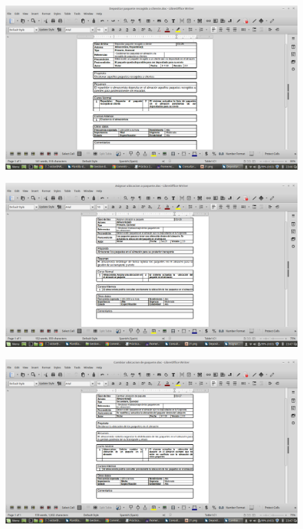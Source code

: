 \begin{figure}[H]
	\centering
	\includegraphics[width=16cm]{25}
\end{figure}
\begin{figure}[H]
	\centering
	\includegraphics[width=16cm]{26}
\end{figure}
\begin{figure}[H]
	\centering
	\includegraphics[width=16cm]{27}
\end{figure}
